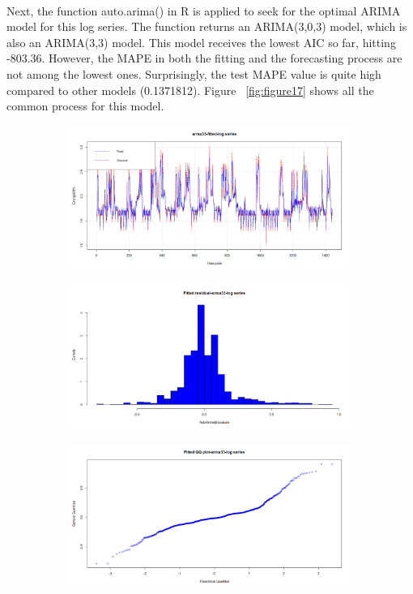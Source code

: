 \documentclass[12pt]{article}
\begin{document}
\paragraph{}
Next, the function auto.arima() in R is applied to seek for the optimal ARIMA model for this log series. The function returns an ARIMA(3,0,3) model, which is also an ARIMA(3,3) model. This model receives the lowest AIC so far, hitting -803.36. However, the MAPE in both the fitting and the forecasting process are not among the lowest ones. Surprisingly, the test MAPE value is quite high compared to other models (0.1371812). Figure ~\ref{fig:figure17} shows all the common process for this model.
\begin{figure}[H]
  \centering
  \begin{subfigure}[b]{0.6\linewidth}
    \includegraphics[width=\linewidth]{figure16-1.png}
  \end{subfigure}
  \begin{subfigure}[b]{0.6\linewidth}
    \includegraphics[width=\linewidth]{figure16-2.png}
  \end{subfigure}
  \begin{subfigure}[b]{0.6\linewidth}
    \includegraphics[width=\linewidth]{figure16-3.png}

\end{subfigure}
\end{figure}
\end{document}
